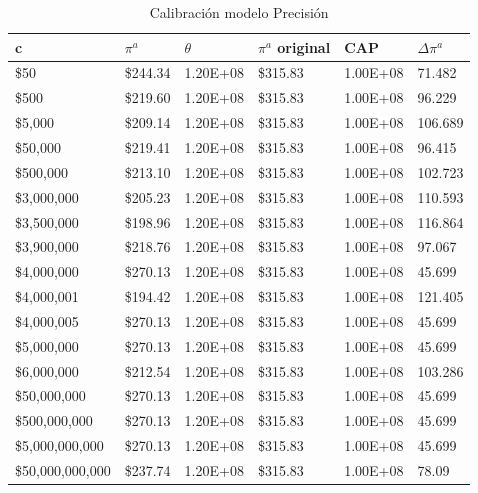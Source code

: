 \begin{table}[H]
    \centering
    \begin{tabular}{|l|l|l|l|l|l|}
    \hline
          c & $\pi^a$ & $\theta$ & $\pi^a$ original &  CAP & $\Delta \pi^a$   \\ \hline
         \$50  &  \$244.34  & 1.20E+08 &  \$315.83  & 1.00E+08 & 71.482  \\ \hline
         \$500  &  \$219.60  & 1.20E+08 &  \$315.83  & 1.00E+08 & 96.229  \\ \hline
         \$5,000  &  \$209.14  & 1.20E+08 &  \$315.83  & 1.00E+08 & 106.689  \\ \hline
         \$50,000  &  \$219.41  & 1.20E+08 &  \$315.83  & 1.00E+08 & 96.415  \\ \hline
         \$500,000  &  \$213.10  & 1.20E+08 &  \$315.83  & 1.00E+08 & 102.723  \\ \hline
         \$3,000,000  &  \$205.23  & 1.20E+08 &  \$315.83  & 1.00E+08 & 110.593  \\ \hline
         \$3,500,000  &  \$198.96  & 1.20E+08 &  \$315.83  & 1.00E+08 & 116.864  \\ \hline
         \$3,900,000  &  \$218.76  & 1.20E+08 &  \$315.83  & 1.00E+08 & 97.067  \\ \hline
         \$4,000,000  &  \$270.13  & 1.20E+08 &  \$315.83  & 1.00E+08 & 45.699  \\ \hline
         \$4,000,001  &  \$194.42  & 1.20E+08 &  \$315.83  & 1.00E+08 & 121.405  \\ \hline
         \$4,000,005  &  \$270.13  & 1.20E+08 &  \$315.83  & 1.00E+08 & 45.699  \\ \hline
         \$5,000,000  &  \$270.13  & 1.20E+08 &  \$315.83  & 1.00E+08 & 45.699  \\ \hline
         \$6,000,000  &  \$212.54  & 1.20E+08 &  \$315.83  & 1.00E+08 & 103.286  \\ \hline
         \$50,000,000  &  \$270.13  & 1.20E+08 &  \$315.83  & 1.00E+08 & 45.699  \\ \hline
         \$500,000,000  &  \$270.13  & 1.20E+08 &  \$315.83  & 1.00E+08 & 45.699  \\ \hline
         \$5,000,000,000  &  \$270.13  & 1.20E+08 &  \$315.83  & 1.00E+08 & 45.699  \\ \hline
         \$50,000,000,000  &  \$237.74  & 1.20E+08 &  \$315.83  & 1.00E+08 & 78.09  \\ \hline
    \end{tabular}
    \caption{{\footnotesize Calibración modelo Precisión }}
    \label{calibracionprecision}
\end{table}

